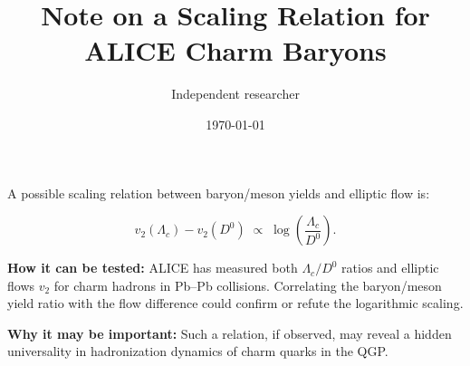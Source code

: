 \documentclass[12pt,a4paper]{article}
\title{Note on a Scaling Relation for ALICE Charm Baryons}
\author{Independent researcher}
\date{\today}
\begin{document}
\maketitle

\noindent
A possible scaling relation between baryon/meson yields and elliptic flow is:

\[
v_2(\Lambda_c) - v_2(D^0) \;\propto\; \log\!\left(\frac{\Lambda_c}{D^0}\right).
\]

\textbf{How it can be tested:}  
ALICE has measured both $\Lambda_c/D^0$ ratios and elliptic flows $v_2$ for charm hadrons in Pb–Pb collisions. Correlating the baryon/meson yield ratio with the flow difference could confirm or refute the logarithmic scaling.

\textbf{Why it may be important:}  
Such a relation, if observed, may reveal a hidden universality in hadronization dynamics of charm quarks in the QGP.
\end{document}
